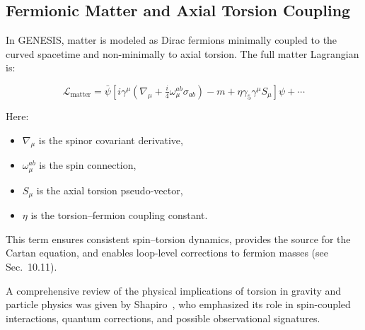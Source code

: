 \documentclass{article}
\begin{document}
\medskip
\begin{center}
\end{center}
\medskip


\subsection*{ Fermionic Matter and Axial Torsion Coupling}

In GENESIS, matter is modeled as Dirac fermions minimally coupled to the curved spacetime and non-minimally to axial torsion. The full matter Lagrangian is:

\[
\mathcal{L}_{\text{matter}} =
\bar{\psi}
\left[
i \gamma^{\mu} \left( \nabla_{\mu} + \tfrac{i}{4} \omega_{\mu}^{ab} \sigma_{ab} \right)
- m
+ \eta \gamma_5 \gamma^{\mu} S_{\mu}
\right] \psi
+ \cdots
\]

Here:
\begin{itemize}
  \item \( \nabla_\mu \) is the spinor covariant derivative,
  \item \( \omega_\mu^{ab} \) is the spin connection,
  \item \( S_\mu \) is the axial torsion pseudo-vector,
  \item \( \eta \) is the torsion–fermion coupling constant.
\end{itemize}

This term ensures consistent spin–torsion dynamics, provides the source for the Cartan equation, and enables loop-level corrections to fermion masses (see Sec.~10.11).

A comprehensive review of the physical implications of torsion in gravity and particle physics was given by Shapiro~\cite{shapiro2002}, who emphasized its role in spin-coupled interactions, quantum corrections, and possible observational signatures.
\end{document}
